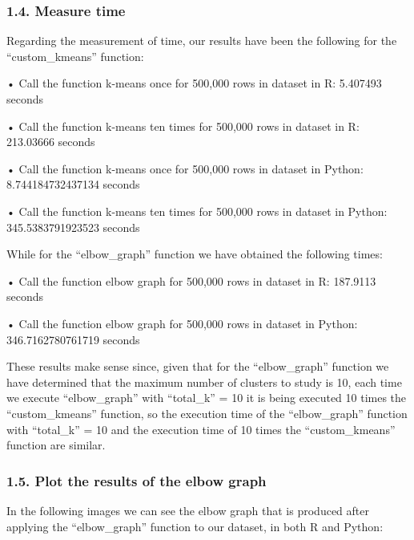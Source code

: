 \documentclass[
]{article}
\begin{document}
\hypertarget{measure-time}{%
\subsubsection{1.4. Measure time}\label{measure-time}}

Regarding the measurement of time, our results have been the following
for the ``custom\_kmeans'' function:

• Call the function k-means once for 500,000 rows in dataset in R:
5.407493 seconds

• Call the function k-means ten times for 500,000 rows in dataset in R:
213.03666 seconds

• Call the function k-means once for 500,000 rows in dataset in Python:
8.744184732437134 seconds

• Call the function k-means ten times for 500,000 rows in dataset in
Python: 345.5383791923523 seconds

While for the ``elbow\_graph'' function we have obtained the following
times:

• Call the function elbow graph for 500,000 rows in dataset in R:
187.9113 seconds

• Call the function elbow graph for 500,000 rows in dataset in Python:
346.7162780761719 seconds

These results make sense since, given that for the ``elbow\_graph''
function we have determined that the maximum number of clusters to study
is 10, each time we execute ``elbow\_graph'' with ``total\_k'' = 10 it
is being executed 10 times the ``custom\_kmeans'' function, so the
execution time of the ``elbow\_graph'' function with ``total\_k'' = 10
and the execution time of 10 times the ``custom\_kmeans'' function are
similar.

\hypertarget{plot-the-results-of-the-elbow-graph}{%
\subsubsection{1.5. Plot the results of the elbow
graph}\label{plot-the-results-of-the-elbow-graph}}

In the following images we can see the elbow graph that is produced
after applying the ``elbow\_graph'' function to our dataset, in both R
and Python:
\end{document}
